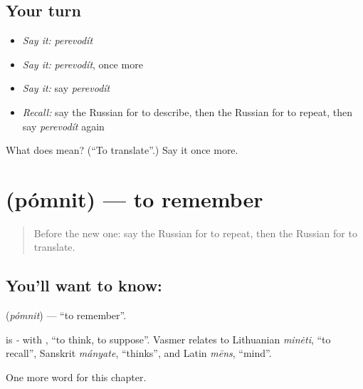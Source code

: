 \subsection*{Your turn}
\begin{itemize}
\raggedright
  \item \emph{Say it:} \emph{perevodít}
  \item \emph{Say it:} \emph{perevodít}, once more
  \item \emph{Say it:} say \emph{perevodít}
  \item \emph{Recall:} say the Russian for to describe, then the Russian for to repeat, then say \emph{perevodít} again
\end{itemize}

\begin{tcolorbox}[breakable,colback=teal!4,colframe=teal!35!black,title={Before you move on}]
What does  mean? (\textquotedblleft{}To translate\textquotedblright{}.) Say it once more.
\end{tcolorbox}
\section[\texorpdfstring{\ru{помнить} (pómnit)}{помнить (pómnit)}]{ (pómnit) — to remember}

\label{lesson:RU-C174-pomnit}



\begin{quote}
Before the new one: say the Russian for to repeat, then the Russian for to translate.
\end{quote}

\subsection*{You'll want to know: }
\textbf{} (\emph{pómnit}) — \textquotedblleft{}to remember\textquotedblright{}.

\begin{cousinweb}
\textbf{} is \emph{-} with \emph{}, \textquotedblleft{}to think, to suppose\textquotedblright{}. Vasmer relates \emph{} to Lithuanian \emph{minėti}, \textquotedblleft{}to recall\textquotedblright{}, Sanskrit \emph{mányate}, \textquotedblleft{}thinks\textquotedblright{}, and Latin \emph{mēns}, \textquotedblleft{}mind\textquotedblright{}.
\end{cousinweb}

\begin{grammarlens}[title={What you've built}]
One more word for this chapter.
\end{grammarlens}

